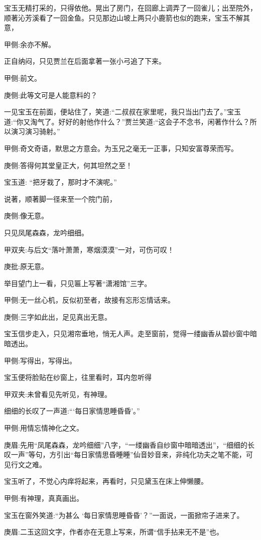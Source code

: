 \begin{parag}
    宝玉无精打采的，只得依他。晃出了房门，在回廊上调弄了一回雀儿；出至院外，顺著沁芳溪看了一回金鱼。只见那边山坡上两只小鹿箭也似的跑来，宝玉不解其意，\begin{note}甲侧:余亦不解。\end{note}正自纳闷，只见贾兰在后面拿著一张小弓追了下来。\begin{note}甲侧:前文。\end{note}\begin{note}庚侧:此等文可是人能意料的？\end{note}一见宝玉在前面，便站住了，笑道:“二叔叔在家里呢，我只当出门去了。”宝玉道:“你又淘气了。好好的射他作什么？”贾兰笑道:“这会子不念书，闲著作什么？所以演习演习骑射。”\begin{note}甲侧:奇文奇语，默思之方意会。为玉兄之毫无一正事，只知安富尊荣而写。\end{note}\begin{note}庚侧:答得何其堂皇正大，何其坦然之至！\end{note}宝玉道: “把牙栽了，那时才不演呢。”
\end{parag}


\begin{parag}
    说著，顺著脚一径来至一个院门前，\begin{note}庚侧:像无意。\end{note}只见凤尾森森，龙吟细细。\begin{note}甲双夹:与后文“落叶萧萧，寒烟漠漠”一对，可伤可叹！\end{note}\begin{note}庚批:原无意。\end{note}举目望门上一看，只见匾上写著“潇湘馆”三字。\begin{note}甲侧:无一丝心机，反似初至者，故接有忘形忘情话来。\end{note}\begin{note}庚侧:三字如此出，足见真出无意。\end{note}宝玉信步走入，只见湘帘垂地，悄无人声。走至窗前，觉得一缕幽香从碧纱窗中暗暗透出。\begin{note}甲侧:写得出，写得出。\end{note}宝玉便将脸贴在纱窗上，往里看时，耳内忽听得\begin{note}甲双夹:未曾看见先听见，有神理。\end{note}细细的长叹了一声道:“‘每日家情思睡昏昏’。”\begin{note}甲侧:用情忘情神化之文。\end{note}\begin{note}庚眉:先用“凤尾森森，龙吟细细”八字，“一缕幽香自纱窗中暗暗透出”，“细细的长叹一声”等句，方引出“每日家情思昏睡睡”仙音妙音来，非纯化功夫之笔不能，可见行文之难。\end{note}宝玉听了，不觉心内痒将起来，再看时，只见黛玉在床上伸懒腰。\begin{note}甲侧:有神理，真真画出。\end{note}宝玉在窗外笑道:“为甚么 ‘每日家情思睡昏昏’？”一面说，一面掀帘子进来了。\begin{note}庚眉:二玉这回文字，作者亦在无意上写来，所谓“信手拈来无不是”也。\end{note}
\end{parag}


